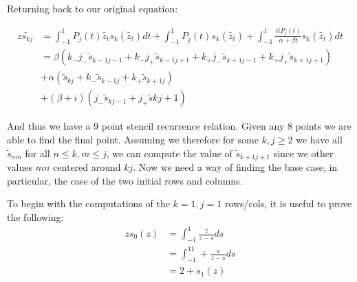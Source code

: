 \documentclass{article}
\begin{document}
Returning back to our original equation:

\begin{align}
    z\tilde{s_{kj}}&=\int_{-1}^1P_j(t)\tilde{z_t}s_k(\tilde{z_t})dt
    +\int_{-1}^1P_j(t)s_k(\tilde{z_t})
    +\int_{-1}^1\frac{itP_j(t)}{\alpha+\beta t}s_k(\tilde{z_t})dt\\
    &=\beta(k_-j_-\tilde{s}_{k-1j-1}+k_-j_+\tilde{s}_{k-1j+1}+k_+j_-\tilde{s}_{k+1j-1}+k_+j_+\tilde{s}_{k+1j+1})\\
    &+\alpha(\tilde{s}_{kj}+k_-\tilde{s}_{k-1j}+k_+\tilde{s}_{k+1j})\\
    &+(\beta+i)(j_-\tilde{s}_{kj-1}+j_+\tilde{s}{kj+1})
\end{align}

And thus we have a 9 point stencil recurrence relation.
Given any 8 points we are able to find the final point.
Assuming we therefore for some $k,j\geq 2$ we have all $\tilde{s}_{nm}$ for all $n\leq k,m\leq j$,
we can compute the value of $\tilde{s}_{k+1j+1}$ since we other values $mn$ centered around $kj$.
Now we need a way of finding the base case, in particular, the case of the two initial rows and columns.

To begin with the computations of the $k=1,j=1$ rows/cols, it is useful to prove the following:
\begin{align}
    zs_0(z)&=\int_{-1}^1\frac{z}{z-s}ds \\
    &= \int_{-1}^11+\frac{s}{z-s}ds\\
    &= 2+s_1(z)
\end{align}
\end{document}
